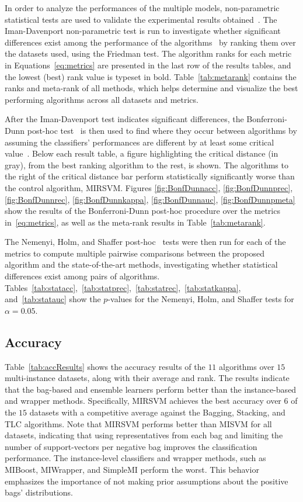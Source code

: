 In order to analyze the performances of the multiple models, non-parametric statistical tests are used to validate the experimental results obtained~\citep{Derrac2011,Garcia20102044}. The Iman-Davenport non-parametric test is run to investigate whether significant differences exist among the performance of the algorithms~\citep{Garcia2008} by ranking them over the datasets used, using the Friedman test. The algorithm ranks for each metric in Equations~\eqref{eq:metrics} are presented in the last row of the results tables, and the lowest (best) rank value is typeset in bold. Table~\ref{tab:metarank} contains the ranks and meta-rank of all methods, which helps determine and visualize the best performing algorithms across all datasets and metrics. 

After the Iman-Davenport test indicates significant differences, the Bonferroni-Dunn post-hoc test~\citep{Dunn1961} is then used to find where they occur between algorithms by assuming the classifiers' performances are different by at least some critical value~\citep{Garcia2009}. Below each result table, a figure highlighting the critical distance (in gray), from the best ranking algorithm to the rest, is shown. The algorithms to the right of the critical distance bar perform statistically significantly worse than the control algorithm, MIRSVM. Figures \ref{fig:BonfDunnacc}, \ref{fig:BonfDunnprec}, \ref{fig:BonfDunnrec}, \ref{fig:BonfDunnkappa}, \ref{fig:BonfDunnauc}, \ref{fig:BonfDunnpmeta} show the results of the Bonferroni-Dunn post-hoc procedure over the metrics in~\eqref{eq:metrics}, as well as the meta-rank results in Table~\ref{tab:metarank}.

The Nemenyi, Holm, and Shaffer post-hoc~\citep{Gibbons2011,Holander1999} tests were then run for each of the metrics to compute multiple pairwise comparisons between the proposed algorithm and the state-of-the-art methods, investigating whether statistical differences exist among pairs of algorithms. Tables~\ref{tab:statacc},~\ref{tab:statprec},~\ref{tab:statrec},~\ref{tab:statkappa}, and~\ref{tab:statauc} show the $p$-values for the Nemenyi, Holm, and Shaffer tests for $\alpha = 0.05$.

\subsection{Accuracy}
Table~\ref{tab:accResults} shows the accuracy results of the $11$ algorithms over $15$ multi-instance datasets, along with their average and rank. The results indicate that the bag-based and ensemble learners perform better than the instance-based and wrapper methods. Specifically, MIRSVM achieves the best accuracy over $6$ of the $15$ datasets with a competitive average against the Bagging, Stacking, and TLC algorithms. Note that MIRSVM performs better than MISVM for all datasets, indicating that using representatives from each bag and limiting the number of support-vectors per negative bag improves the classification performance. The instance-level classifiers and wrapper methods, such as MIBoost, MIWrapper, and SimpleMI perform the worst. This behavior emphasizes the importance of not making prior assumptions about the positive bags' distributions. 

